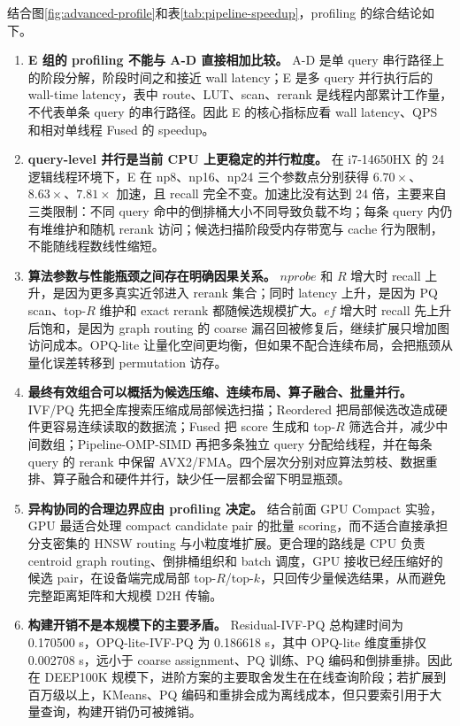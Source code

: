 \documentclass[a4paper]{article}
\begin{document}
结合图\ref{fig:advanced-profile}和表\ref{tab:pipeline-speedup}，profiling 的综合结论如下。
\begin{enumerate}
\item \textbf{E 组的 profiling 不能与 A-D 直接相加比较。} A-D 是单 query 串行路径上的阶段分解，阶段时间之和接近 wall latency；E 是多 query 并行执行后的 wall-time latency，表中 route、LUT、scan、rerank 是线程内部累计工作量，不代表单条 query 的串行路径。因此 E 的核心指标应看 wall latency、QPS 和相对单线程 Fused 的 speedup。
\item \textbf{query-level 并行是当前 CPU 上更稳定的并行粒度。} 在 i7-14650HX 的 24 逻辑线程环境下，E 在 np8、np16、np24 三个参数点分别获得 $6.70\times$、$8.63\times$、$7.81\times$ 加速，且 recall 完全不变。加速比没有达到 24 倍，主要来自三类限制：不同 query 命中的倒排桶大小不同导致负载不均；每条 query 内仍有堆维护和随机 rerank 访问；候选扫描阶段受内存带宽与 cache 行为限制，不能随线程数线性缩短。
\item \textbf{算法参数与性能瓶颈之间存在明确因果关系。} $nprobe$ 和 $R$ 增大时 recall 上升，是因为更多真实近邻进入 rerank 集合；同时 latency 上升，是因为 PQ scan、top-$R$ 维护和 exact rerank 都随候选规模扩大。$ef$ 增大时 recall 先上升后饱和，是因为 graph routing 的 coarse 漏召回被修复后，继续扩展只增加图访问成本。OPQ-lite 让量化空间更均衡，但如果不配合连续布局，会把瓶颈从量化误差转移到 permutation 访存。
\item \textbf{最终有效组合可以概括为候选压缩、连续布局、算子融合、批量并行。} IVF/PQ 先把全库搜索压缩成局部候选扫描；Reordered 把局部候选改造成硬件更容易连续读取的数据流；Fused 把 score 生成和 top-$R$ 筛选合并，减少中间数组；Pipeline-OMP-SIMD 再把多条独立 query 分配给线程，并在每条 query 的 rerank 中保留 AVX2/FMA。四个层次分别对应算法剪枝、数据重排、算子融合和硬件并行，缺少任一层都会留下明显瓶颈。
\item \textbf{异构协同的合理边界应由 profiling 决定。} 结合前面 GPU Compact 实验，GPU 最适合处理 compact candidate pair 的批量 scoring，而不适合直接承担分支密集的 HNSW routing 与小粒度堆扩展。更合理的路线是 CPU 负责 centroid graph routing、倒排桶组织和 batch 调度，GPU 接收已经压缩好的候选 pair，在设备端完成局部 top-$R$/top-$k$，只回传少量候选结果，从而避免完整距离矩阵和大规模 D2H 传输。
\item \textbf{构建开销不是本规模下的主要矛盾。} Residual-IVF-PQ 总构建时间为 0.170500 s，OPQ-lite-IVF-PQ 为 0.186618 s，其中 OPQ-lite 维度重排仅 0.002708 s，远小于 coarse assignment、PQ 训练、PQ 编码和倒排重排。因此在 DEEP100K 规模下，进阶方案的主要取舍发生在在线查询阶段；若扩展到百万级以上，KMeans、PQ 编码和重排会成为离线成本，但只要索引用于大量查询，构建开销仍可被摊销。
\end{enumerate}
\end{document}
